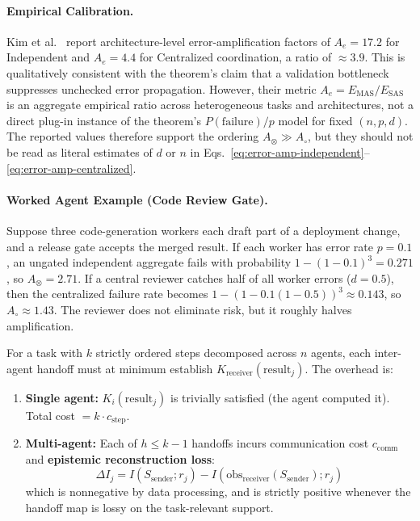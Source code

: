 \paragraph{Empirical Calibration.} Kim et al.~\cite{kim2025scaling} report architecture-level error-amplification factors of $A_e = 17.2$ for Independent and $A_e = 4.4$ for Centralized coordination, a ratio of $\approx 3.9$. This is qualitatively consistent with the theorem's claim that a validation bottleneck suppresses unchecked error propagation. However, their metric $A_e = E_{\mathrm{MAS}}/E_{\mathrm{SAS}}$ is an aggregate empirical ratio across heterogeneous tasks and architectures, not a direct plug-in instance of the theorem's $P(\mathrm{failure})/p$ model for fixed $(n,p,d)$. The reported values therefore support the ordering $A_{\otimes} \gg A_{\circ}$, but they should not be read as literal estimates of $d$ or $n$ in Eqs.~\eqref{eq:error-amp-independent}--\eqref{eq:error-amp-centralized}.

\paragraph{Worked Agent Example (Code Review Gate).}
Suppose three code-generation workers each draft part of a deployment change, and a release gate accepts the merged result. If each worker has error rate $p=0.1$, an ungated independent aggregate fails with probability $1-(1-0.1)^3 = 0.271$, so $A_{\otimes}=2.71$. If a central reviewer catches half of all worker errors ($d=0.5$), then the centralized failure rate becomes $1-(1-0.1(1-0.5))^3 \approx 0.143$, so $A_{\circ}\approx 1.43$. The reviewer does not eliminate risk, but it roughly halves amplification.

\begin{theorem}
\label{thm:sequential-penalty}
For a task with $k$ strictly ordered steps decomposed across $n$ agents, each inter-agent handoff must at minimum establish $K_{\mathrm{receiver}}(\mathrm{result}_j)$. The overhead is:
\begin{enumerate}[leftmargin=*]
\item[(a)] \textbf{Single agent:} $K_i(\mathrm{result}_j)$ is trivially satisfied (the agent computed it). Total cost $= k \cdot c_{\mathrm{step}}$.
\item[(b)] \textbf{Multi-agent:} Each of $h \le k-1$ handoffs incurs communication cost $c_{\mathrm{comm}}$ and \textbf{epistemic reconstruction loss}:
\begin{equation}
\Delta I_j = I(S_{\mathrm{sender}}; r_j) - I(\mathrm{obs}_{\mathrm{receiver}}(S_{\mathrm{sender}}); r_j)
\label{eq:epistemic-reconstruction-loss}
\end{equation}
which is nonnegative by data processing, and is strictly positive whenever the handoff map is lossy on the task-relevant support.
\end{enumerate}
\end{theorem}

